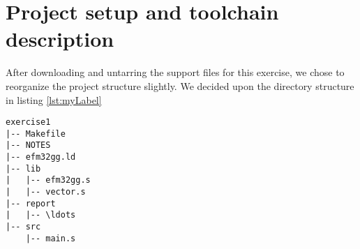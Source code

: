 \section{Project setup and toolchain description}

After downloading and untarring the support files for this exercise, we chose to reorganize the project structure slightly. We decided upon the directory structure in listing \ref{lst:myLabel}

\begin{lstlisting}[label=lst:myLabel,caption=Directory structure]
exercise1
|-- Makefile
|-- NOTES
|-- efm32gg.ld
|-- lib
|   |-- efm32gg.s
|   |-- vector.s
|-- report
|   |-- \ldots
|-- src
    |-- main.s
\end{lstlisting}
